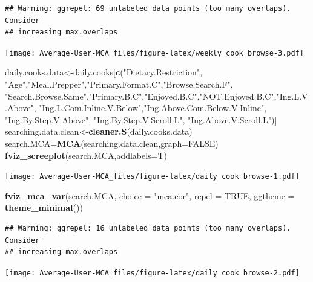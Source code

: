 \documentclass[
]{article}
\newenvironment{Shaded}{\begin{snugshade}}{\end{snugshade}}
\newcommand{\DataTypeTok}[1]{\textcolor[rgb]{0.13,0.29,0.53}{#1}}
\newcommand{\KeywordTok}[1]{\textcolor[rgb]{0.13,0.29,0.53}{\textbf{#1}}}
\newcommand{\NormalTok}[1]{#1}
\newcommand{\OtherTok}[1]{\textcolor[rgb]{0.56,0.35,0.01}{#1}}
\newcommand{\StringTok}[1]{\textcolor[rgb]{0.31,0.60,0.02}{#1}}
\begin{document}
\begin{verbatim}
## Warning: ggrepel: 69 unlabeled data points (too many overlaps). Consider
## increasing max.overlaps
\end{verbatim}

\texttt{[image: Average-User-MCA\_files/figure-latex/weekly cook browse-3.pdf]}

\begin{Shaded}
\begin{Highlighting}[]
\NormalTok{daily.cooks.data<-daily.cooks[}\KeywordTok{c}\NormalTok{(}\StringTok{"Dietary.Restriction"}\NormalTok{, }\StringTok{"Age"}\NormalTok{,}\StringTok{"Meal.Prepper"}\NormalTok{,}\StringTok{"Primary.Format.C"}\NormalTok{,}\StringTok{"Browse.Search.F"}\NormalTok{,}
            \StringTok{"Search.Browse.Same"}\NormalTok{,}\StringTok{"Primary.B.C"}\NormalTok{,}\StringTok{"Enjoyed.B.C"}\NormalTok{,}\StringTok{"NOT.Enjoyed.B.C"}\NormalTok{,}\StringTok{"Ing.L.V.Above"}\NormalTok{,}
            \StringTok{"Ing.L.Com.Inline.V.Below"}\NormalTok{,}\StringTok{"Ing.Above.Com.Below.V.Inline"}\NormalTok{,  }\StringTok{"Ing.By.Step.V.Above"}\NormalTok{,  }\StringTok{"Ing.By.Step.V.Scroll.L"}\NormalTok{,}
            \StringTok{"Ing.Above.V.Scroll.L"}\NormalTok{)]}
\NormalTok{searching.data.clean<-}\KeywordTok{cleaner.S}\NormalTok{(daily.cooks.data)}
\NormalTok{search.MCA=}\KeywordTok{MCA}\NormalTok{(searching.data.clean,}\DataTypeTok{graph=}\OtherTok{FALSE}\NormalTok{)}
\KeywordTok{fviz_screeplot}\NormalTok{(search.MCA,}\DataTypeTok{addlabels=}\NormalTok{T)}
\end{Highlighting}
\end{Shaded}

\texttt{[image: Average-User-MCA\_files/figure-latex/daily cook browse-1.pdf]}

\begin{Shaded}
\begin{Highlighting}[]
\KeywordTok{fviz_mca_var}\NormalTok{(search.MCA, }\DataTypeTok{choice =} \StringTok{"mca.cor"}\NormalTok{, }\DataTypeTok{repel =} \OtherTok{TRUE}\NormalTok{,}
             \DataTypeTok{ggtheme =} \KeywordTok{theme_minimal}\NormalTok{())}
\end{Highlighting}
\end{Shaded}

\begin{verbatim}
## Warning: ggrepel: 16 unlabeled data points (too many overlaps). Consider
## increasing max.overlaps
\end{verbatim}

\texttt{[image: Average-User-MCA\_files/figure-latex/daily cook browse-2.pdf]}
\end{document}

